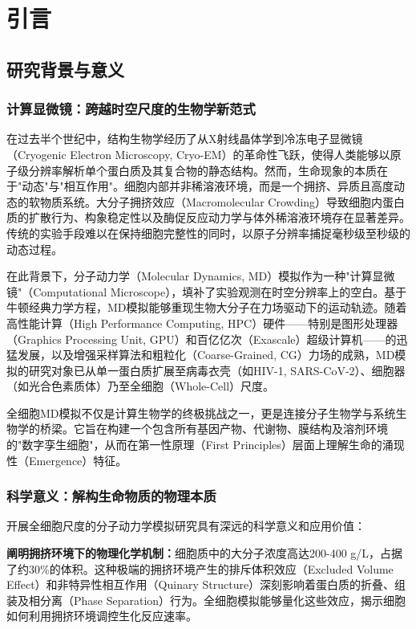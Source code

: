 \chapter{引言}\label{chap:introduction}

\section{研究背景与意义}

\subsection{计算显微镜：跨越时空尺度的生物学新范式}

在过去半个世纪中，结构生物学经历了从X射线晶体学到冷冻电子显微镜（Cryogenic Electron Microscopy, Cryo-EM）的革命性飞跃，使得人类能够以原子级分辨率解析单个蛋白质及其复合物的静态结构。然而，生命现象的本质在于"动态"与"相互作用"。细胞内部并非稀溶液环境，而是一个拥挤、异质且高度动态的软物质系统。大分子拥挤效应（Macromolecular Crowding）导致细胞内蛋白质的扩散行为、构象稳定性以及酶促反应动力学与体外稀溶液环境存在显著差异\cite{ellis2001macromolecular}。传统的实验手段难以在保持细胞完整性的同时，以原子分辨率捕捉毫秒级至秒级的动态过程。

在此背景下，分子动力学（Molecular Dynamics, MD）模拟作为一种"计算显微镜"（Computational Microscope），填补了实验观测在时空分辨率上的空白\cite{mccammon1977dynamics}。基于牛顿经典力学方程，MD模拟能够重现生物大分子在力场驱动下的运动轨迹。随着高性能计算（High Performance Computing, HPC）硬件——特别是图形处理器（Graphics Processing Unit, GPU）和百亿亿次（Exascale）超级计算机——的迅猛发展，以及增强采样算法和粗粒化（Coarse-Grained, CG）力场的成熟，MD模拟的研究对象已从单一蛋白质扩展至病毒衣壳（如HIV-1, SARS-CoV-2）、细胞器（如光合色素质体）乃至全细胞（Whole-Cell）尺度\cite{lenner2023whole}。

全细胞MD模拟不仅是计算生物学的终极挑战之一，更是连接分子生物学与系统生物学的桥梁。它旨在构建一个包含所有基因产物、代谢物、膜结构及溶剂环境的"数字孪生细胞"，从而在第一性原理（First Principles）层面上理解生命的涌现性（Emergence）特征\cite{feig2023current}。

\subsection{科学意义：解构生命物质的物理本质}

开展全细胞尺度的分子动力学模拟研究具有深远的科学意义和应用价值：

\textbf{阐明拥挤环境下的物理化学机制：}细胞质中的大分子浓度高达200-400 g/L，占据了约30\%的体积。这种极端的拥挤环境产生的排斥体积效应（Excluded Volume Effect）和非特异性相互作用（Quinary Structure）深刻影响着蛋白质的折叠、组装及相分离（Phase Separation）行为。全细胞模拟能够量化这些效应，揭示细胞如何利用拥挤环境调控生化反应速率\cite{spitzer2023molecular}。

